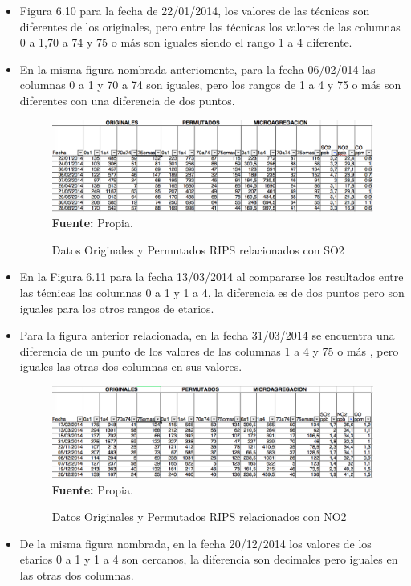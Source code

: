 \documentclass[a4paper,openright,12pt]{book}
\theoremstyle{definition}
\theoremstyle{remark}
\begin{document}
\begin{itemize}
	\item Figura 6.10 para la fecha de 22/01/2014, los valores de las técnicas son diferentes de los originales, pero  entre las técnicas los valores de las columnas 0 a 1,70 a 74 y 75 o más son iguales siendo el rango 1 a 4 diferente.
    \item En la misma figura nombrada anteriomente,  para la fecha 06/02/014 las columnas 0 a 1 y 70 a 74 son iguales, pero  los rangos de 1 a 4 y 75 o más son diferentes con una diferencia de dos puntos.
\begin{figure}[ht]
\centering
\caption{Datos Originales y Permutados RIPS relacionados con SO2} 
\includegraphics[scale=0.45]{Puente_Aranda/SO2_Puente_Aranda}
\label{fig:Tabla1}
\\ \textbf{Fuente: }Propia.
\end{figure}
    \item En la Figura 6.11 para la fecha 13/03/2014 al compararse los resultados entre las técnicas las columnas 0 a 1 y 1 a 4, la diferencia es de dos puntos  pero son iguales para los otros rangos de etarios.
    \item Para la figura anterior relacionada, en la fecha 31/03/2014 se encuentra una diferencia de un punto de los valores de las columnas 1 a 4 y 75 o más , pero iguales las otras dos columnas en sus valores.
\begin{figure}[ht]
\centering
\caption{Datos Originales y Permutados RIPS relacionados con NO2} 
\includegraphics[scale=0.45]{Puente_Aranda/NO2_Puente_Aranda}
\label{fig:Tabla1}
\\ \textbf{Fuente: }Propia.
\end{figure}
    \item De la misma figura nombrada, en la fecha 20/12/2014 los valores de los etarios 0 a 1 y 1 a 4 son cercanos, la diferencia son decimales pero iguales en las otras dos columnas.

\end{itemize}
\end{document}
